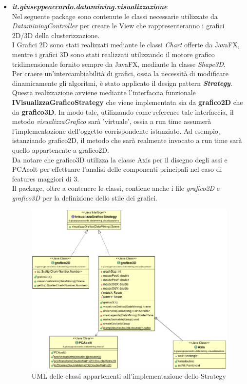 \documentclass[a4paper, oneside]{book}
\begin{document}
\begin{itemize}
 \item \textit{\textbf{it.giuseppeaccardo.datamining.visualizzazione}} \\
  Nel seguente package sono contenute le classi necessarie utilizzate da \textit{DataminingController} per creare le View che rappresenteranno i grafici 2D/3D della clusterizzazione.\\
  I Grafici 2D sono stati realizzati mediante le classi \textit{Chart} offerte da JavaFX, mentre i grafici 3D sono stati realizzati utilizzando il motore grafico tridimensionale fornito sempre da JavaFX, mediante la classe \textit{Shape3D}.\\
  Per craere un'intercambiabilità di grafici, ossia la necessità di modificare dinamicamente gli algoritmi, è stato applicato il design pattern \textit{\textbf{Strategy}}.\\
  Questa realizzazione avviene mediante l'interfaccia funzionale \textbf{IVisualizzaGraficoStrategy} che viene implementata sia da 
  \textbf{grafico2D} che da \textbf{grafico3D}. In modo tale, utilizzando come reference tale interfaccia, il metodo \textit{visualizzaGrafico} sarà 'virtuale', ossia a run time assumerà l'implementazione dell'oggetto corrispondente istanziato. Ad esempio, istanziando grafico2D, il metodo che sarà realmente invocato a run time sarà quello appartenente a grafico2D.\\
  Da notare che grafico3D utilizza la classe Axis per il disegno degli assi e PCAcolt per effettuare l'analisi delle componenti principali nel caso di features maggiori di 3.
  \\
  Il package, oltre a contenere le classi, contiene anche i file \textit{grafico2D} e \textit{grafico3D}  per la definizione dello stile dei grafici.\\
  
    \begin{figure}[htp]
\centering
\includegraphics[width=13cm]{umlVisualizzazione.png}
\caption{UML delle classi appartenenti all'implementazione dello Strategy}
\label{fig:uml visualizzazione}
\end{figure}
\end{itemize}
\end{document}
